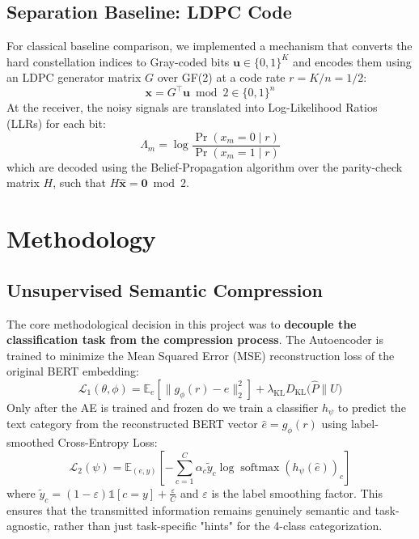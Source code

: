 \documentclass[a4paper,11pt]{article}
\begin{document}
\subsection{Separation Baseline: LDPC Code}
For classical baseline comparison, we implemented a mechanism that converts the hard constellation indices to Gray-coded bits $\mathbf{u} \in \{0,1\}^K$ and encodes them using an LDPC generator matrix $G$ over GF(2) at a code rate $r = K/n = 1/2$:
\begin{equation}
\mathbf{x} = G^{\top}\mathbf{u} \bmod 2 \in \{0,1\}^n
\end{equation}
At the receiver, the noisy signals are translated into Log-Likelihood Ratios (LLRs) for each bit:
\begin{equation}
\Lambda_m = \log\frac{\Pr(x_m = 0 \mid r)}{\Pr(x_m = 1 \mid r)}
\end{equation}
which are decoded using the Belief-Propagation algorithm over the parity-check matrix $H$, such that $H\hat{\mathbf{x}} = \mathbf{0} \bmod 2$.

\section{Methodology}

\subsection{Unsupervised Semantic Compression}
The core methodological decision in this project was to \textbf{decouple the classification task from the compression process}.
The Autoencoder is trained to minimize the Mean Squared Error (MSE) reconstruction loss of the original BERT embedding:
\begin{equation}
\mathcal{L}_1(\theta, \phi) = \mathbb{E}_{e}\left[\big\lVert g_\phi(r) - e \big\rVert_2^2\right] + \lambda_{\mathrm{KL}} D_{\mathrm{KL}}\big(\hat P \| U\big)
\end{equation}
Only after the AE is trained and frozen do we train a classifier $h_\psi$ to predict the text category from the reconstructed BERT vector $\hat{e} = g_\phi(r)$ using label-smoothed Cross-Entropy Loss:
\begin{equation}
\mathcal{L}_2(\psi) = \mathbb{E}_{(e,y)}\left[ -\sum_{c=1}^{C} \alpha_c \tilde y_c \log \operatorname{softmax}(h_\psi(\hat{e}))_c \right]
\end{equation}
where $\tilde y_c = (1 - \varepsilon)\mathbb{1}[c = y] + \frac{\varepsilon}{C}$ and $\varepsilon$ is the label smoothing factor. This ensures that the transmitted information remains genuinely semantic and task-agnostic, rather than just task-specific "hints" for the 4-class categorization.
\end{document}
